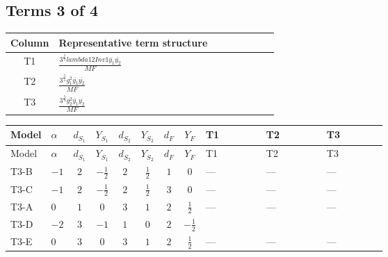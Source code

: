 \documentclass[8pt]{article}
\begin{document}
\begin{landscape}
\subsection*{Terms 3 of 4}
\begin{center}
\begin{tabular}{@{}c >{\raggedright\arraybackslash}p{0.82\linewidth}@{}}
\toprule
Column & Representative term structure \\
\midrule
T1 & \(\displaystyle \frac{3^{\frac{3}{4}} lambda12Inv1 \overline{y_{1}} \overline{y_{2}}}{MF}\) \\
\midrule
T2 & \(\displaystyle \frac{3^{\frac{3}{4}} g_{1}^{2} \overline{y_{1}} \overline{y_{2}}}{MF}\) \\
\midrule
T3 & \(\displaystyle \frac{3^{\frac{3}{4}} g_{2}^{2} \overline{y_{1}} \overline{y_{2}}}{MF}\) \\
\midrule
\bottomrule
\end{tabular}
\end{center}
\smallskip
\tiny
\begin{longtable}{@{}llcccccc >{\raggedright\arraybackslash}p{0.21\linewidth} >{\raggedright\arraybackslash}p{0.21\linewidth} >{\raggedright\arraybackslash}p{0.21\linewidth}@{}}
\toprule
Model & $\alpha$ & $d_{S_1}$ & $Y_{S_1}$ & $d_{S_2}$ & $Y_{S_2}$ & $d_F$ & $Y_F$ & T1 & T2 & T3 \\
\midrule
\endfirsthead
\toprule
Model & $\alpha$ & $d_{S_1}$ & $Y_{S_1}$ & $d_{S_2}$ & $Y_{S_2}$ & $d_F$ & $Y_F$ & T1 & T2 & T3 \\
\midrule
\endhead
T3-B & $-1$ & $2$ & $-\frac{1}{2}$ & $2$ & $\frac{1}{2}$ & $1$ & $0$ & --- & --- & --- \\
\midrule
T3-C & $-1$ & $2$ & $-\frac{1}{2}$ & $2$ & $\frac{1}{2}$ & $3$ & $0$ & --- & --- & --- \\
\midrule
T3-A & $0$ & $1$ & $0$ & $3$ & $1$ & $2$ & $\frac{1}{2}$ & --- & --- & --- \\
\midrule
T3-D & $-2$ & $3$ & $-1$ & $1$ & $0$ & $2$ & $-\frac{1}{2}$ & \scriptsize\adjustbox{max width=\linewidth}{$\begin{gathered} \frac{3^{\frac{3}{4}} lambda12Inv1 \overline{y_{1}} \overline{y_{2}}}{6 MF}\end{gathered}$} & \scriptsize\adjustbox{max width=\linewidth}{$\begin{gathered} \frac{3^{\frac{3}{4}} g_{1}^{2} \overline{y_{1}} \overline{y_{2}}}{8 MF}\end{gathered}$} & \scriptsize\adjustbox{max width=\linewidth}{$\begin{gathered} \frac{25 \cdot 3^{\frac{3}{4}} g_{2}^{2} \overline{y_{1}} \overline{y_{2}}}{24 MF}\end{gathered}$} \\
\midrule
T3-E & $0$ & $3$ & $0$ & $3$ & $1$ & $2$ & $\frac{1}{2}$ & --- & --- & --- \\
\midrule
\bottomrule
\end{longtable}
\clearpage

\end{landscape}
\end{document}
